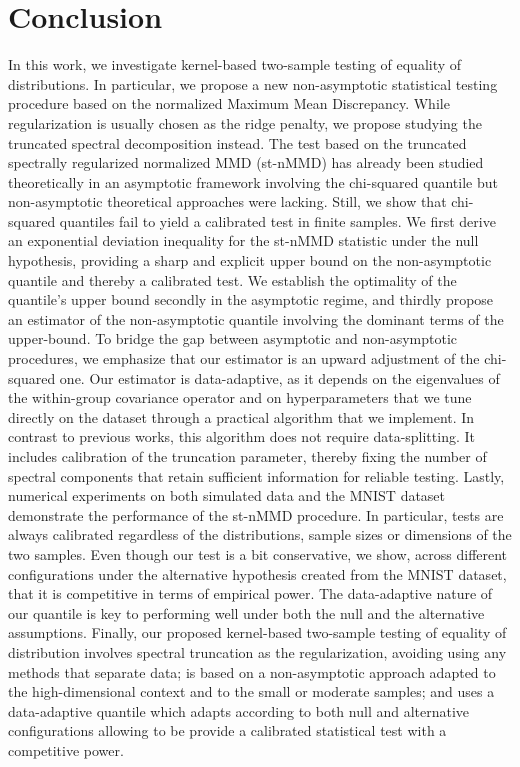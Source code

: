 \documentclass[twoside,11pt]{article}
\begin{document}
\section{Conclusion}
In this work, we investigate kernel-based two-sample testing of equality of distributions. In particular, we propose a new non-asymptotic statistical testing procedure based on the normalized Maximum Mean Discrepancy. While regularization is usually chosen as the ridge penalty, we propose studying the truncated spectral decomposition instead. The test based on the truncated spectrally regularized normalized MMD (st-nMMD) has already been studied theoretically in an asymptotic framework involving the chi-squared quantile but non-asymptotic theoretical approaches were lacking. Still, we show that chi-squared quantiles fail to yield a calibrated test in finite samples. 
We first derive an exponential deviation inequality for the st-nMMD statistic under the null hypothesis, providing a sharp and explicit upper bound on the non-asymptotic quantile and thereby a calibrated test. 
We establish the optimality of the quantile's upper bound secondly in the asymptotic regime, and thirdly propose an estimator of the non-asymptotic quantile involving the dominant terms of the upper-bound. To bridge the gap between asymptotic and non-asymptotic procedures, we emphasize that our estimator is an upward adjustment of the chi-squared one. 
Our estimator is data-adaptive, as it depends on the eigenvalues of the within-group covariance operator and on hyperparameters that we tune directly on the dataset through a practical algorithm that we implement. In contrast to previous works, this algorithm does not require data-splitting. It includes calibration of the truncation parameter, thereby fixing the number of spectral components that retain sufficient information for reliable testing.
Lastly, numerical experiments on both simulated data and the MNIST dataset demonstrate the performance of the st-nMMD procedure. In particular, tests are always calibrated regardless of the distributions, sample sizes or dimensions of the two samples. 
Even though our test is a bit conservative,  
we show, across different configurations under the alternative hypothesis created from the MNIST dataset, that it is competitive in terms of empirical power. 
The data-adaptive nature of our quantile is key to performing well under both the null and the alternative assumptions. 
Finally, our proposed kernel-based two-sample testing of equality of distribution involves spectral truncation as the regularization, avoiding using any methods that separate data; is based on a non-asymptotic approach adapted to the high-dimensional context and to the small or moderate samples; and uses a data-adaptive quantile which adapts according to both null and alternative configurations allowing to be provide a calibrated statistical test with a competitive power. 
\end{document}
